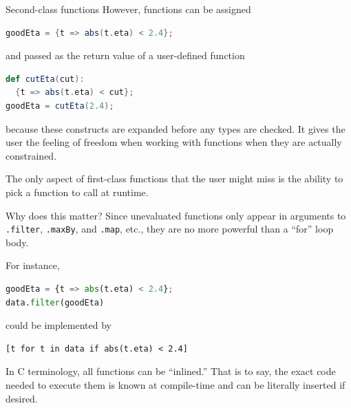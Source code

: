 \documentclass{beamer}
\begin{document}
\begin{frame}[fragile]{Second-class functions}
\vspace{0.5 cm}
However, functions can be assigned
\begin{center}
\begin{minipage}{0.9\linewidth}
\small
\begin{lstlisting}[language=scala]
goodEta = {t => abs(t.eta) < 2.4};
\end{lstlisting}
\end{minipage}
\end{center}
and passed as the return value of a user-defined function
\begin{center}
\begin{minipage}{0.9\linewidth}
\small
\begin{lstlisting}[language=scala]
def cutEta(cut):
  {t => abs(t.eta) < cut};
goodEta = cutEta(2.4);
\end{lstlisting}
\end{minipage}
\end{center}
because these constructs are expanded before any types are checked. It gives the user the feeling of freedom when working with functions when they are actually constrained.

\vspace{0.5 cm}
The only aspect of first-class functions that the user might miss is the ability to pick a function to call at runtime.
\end{frame}

\begin{frame}[fragile]{Why does this matter?}
\vspace{0.5 cm}
Since unevaluated functions only appear in arguments to {\tt .filter}, {\tt .maxBy}, and {\tt .map}, etc., they are no more powerful than a ``for'' loop body.

\vspace{0.25 cm}
For instance,
\begin{center}
\begin{minipage}{0.9\linewidth}
\small
\begin{lstlisting}[language=python]
goodEta = {t => abs(t.eta) < 2.4};
data.filter(goodEta)
\end{lstlisting}
\end{minipage}
\end{center}
could be implemented by
\begin{center}
\begin{minipage}{0.9\linewidth}
\small
\begin{verbatim}
[t for t in data if abs(t.eta) < 2.4]
\end{verbatim}
\end{minipage}
\end{center}
In C terminology, all functions can be ``inlined.'' That is to say, the exact code needed to execute them is known at compile-time and can be literally inserted if desired.
\end{frame}
\end{document}
